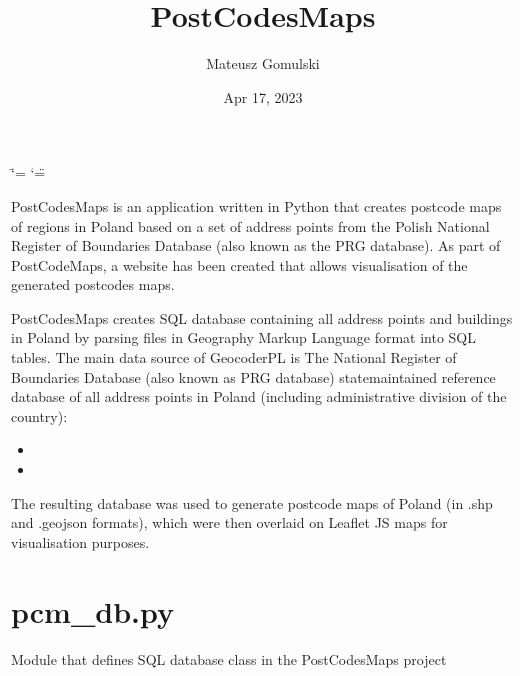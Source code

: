\documentclass[letterpaper,10pt,english]{sphinxmanual}
\title{PostCodesMaps}
\date{Apr 17, 2023}
\author{Mateusz Gomulski}
\begin{document}
\ifdefined\shorthandoff
  \ifnum\catcode`\=\string=\active\shorthandoff{=}\fi
  \ifnum\catcode`\"=\active{}\fi
\fi

\pagestyle{empty}
\sphinxmaketitle
\pagestyle{plain}
\sphinxtableofcontents
\pagestyle{normal}
\label{\detokenize{index::doc}}


\sphinxAtStartPar
PostCodesMaps is an application written in Python that creates postcode maps of regions in Poland based on a set of address points from the Polish National Register of Boundaries Database (also known as the PRG database). As part of PostCodeMaps, a website has been created that allows visualisation of the generated postcodes maps.

\sphinxAtStartPar
PostCodesMaps creates SQL database containing all address points and buildings in Poland by parsing files in Geography Markup Language format into SQL tables. The main data source of GeocoderPL is The National Register of Boundaries Database (also known as PRG database) \sphinxhyphen{} state\sphinxhyphen{}maintained reference database of all address points in Poland (including administrative division of the country):
\begin{itemize}
\item {} 
\sphinxAtStartPar
{}

\item {} 
\sphinxAtStartPar
{}

\end{itemize}

\sphinxAtStartPar
The resulting database was used to generate postcode maps of Poland (in .shp and .geojson formats), which were then overlaid on Leaflet JS maps for visualisation purposes.

\sphinxstepscope


\chapter{pcm\_db.py}
\label{\detokenize{pcm_db:module-pcm_db}}\label{\detokenize{pcm_db:pcm-db-py}}\label{\detokenize{pcm_db::doc}}
\sphinxAtStartPar
Module that defines SQL database class in the PostCodesMaps project
\end{document}
